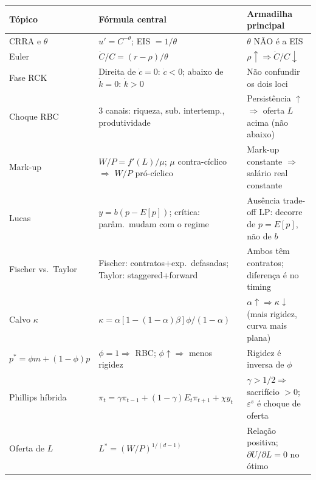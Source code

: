\documentclass[12pt, a4paper]{article}
\begin{document}
\begin{center}
\renewcommand{\arraystretch}{1.4}
\begin{tabular}{p{3.2cm} p{5.2cm} p{5.2cm}}
\toprule
\textbf{Tópico} & \textbf{Fórmula central} & \textbf{Armadilha principal} \\
\midrule
CRRA e $\theta$ & $u'= C^{-\theta}$; EIS $= 1/\theta$ & $\theta$ NÃO é a EIS \\
Euler & $\dot C/C = (r-\rho)/\theta$ & $\rho\uparrow \Rightarrow \dot C/C\downarrow$ \\
Fase RCK & Direita de $\dot c=0$: $\dot c<0$; abaixo de $\dot k=0$: $\dot k>0$ & Não confundir os dois loci \\
Choque RBC & 3 canais: riqueza, sub. intertemp., produtividade & Persistência $\uparrow$ $\Rightarrow$ oferta $L$ acima (não abaixo) \\
Mark-up & $W/P = f'(L)/\mu$; $\mu$ contra-cíclico $\Rightarrow$ $W/P$ pró-cíclico & Mark-up constante $\Rightarrow$ salário real constante \\
Lucas & $y=b(p-E[p])$; crítica: parâm.\ mudam com o regime & Ausência trade-off LP: decorre de $p=E[p]$, não de $b$ \\
Fischer vs.\ Taylor & Fischer: contratos+exp.\ defasadas; Taylor: staggered+forward & Ambos têm contratos; diferença é no timing \\
Calvo $\kappa$ & $\kappa = \alpha[1-(1-\alpha)\beta]\phi/(1-\alpha)$ & $\alpha\uparrow \Rightarrow \kappa\downarrow$ (mais rigidez, curva mais plana) \\
$p^*=\phi m+(1-\phi)p$ & $\phi=1 \Rightarrow$ RBC; $\phi\uparrow \Rightarrow$ menos rigidez & Rigidez é inversa de $\phi$ \\
Phillips híbrida & $\pi_t = \gamma\pi_{t-1}+(1-\gamma)E_t\pi_{t+1}+\chi y_t$ & $\gamma>1/2 \Rightarrow$ sacrifício $>0$; $\varepsilon^s$ é choque de oferta \\
Oferta de $L$ & $L^*=(W/P)^{1/(d-1)}$ & Relação positiva; $\partial U/\partial L=0$ no ótimo \\
\bottomrule
\end{tabular}
\end{center}
\end{document}
